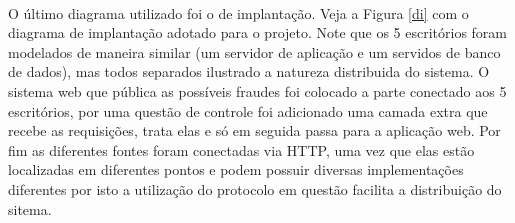 \documentclass[a4paper,10pt]{article}
\begin{document}
\paragraph{}
O último diagrama utilizado foi o de implantação. Veja a Figura \ref{di} com o
diagrama de implantação adotado para o projeto. Note que os 5 escritórios foram
modelados de maneira similar (um servidor de aplicação e um servidos de banco
de dados), mas todos separados ilustrado a natureza distribuida do sistema.
O sistema web que pública as possíveis fraudes foi colocado a parte conectado
aos 5 escritórios, por uma questão de controle foi adicionado uma camada extra
que recebe as requisições, trata elas e só em seguida passa para a aplicação
web. Por fim as diferentes fontes foram conectadas via HTTP, uma vez que elas
estão localizadas em diferentes pontos e podem possuir diversas implementações
diferentes por isto a utilização do protocolo em questão facilita a
distribuição do sitema.
\end{document}
